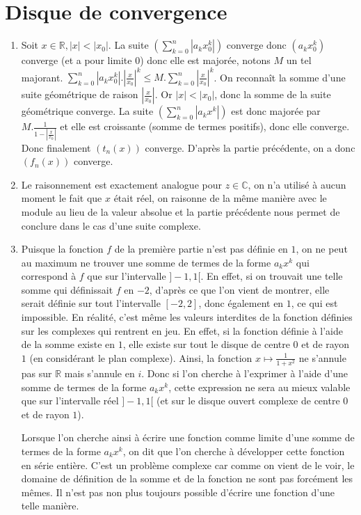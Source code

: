\documentclass[10pt,a4paper]{article}
\begin{document}
\section{Disque de convergence}
\begin{enumerate}
\item Soit $x\in\mathbb{R}, | x|<| x_0|$. La suite $(\sum\limits_{k=0}^n| a_kx_0^k|)$ converge donc $(a_kx_0^k)$ converge 
(et a pour limite $0$) donc elle est majorée, notons $M$ un tel majorant.
$\sum\limits_{k=0}^n| a_kx_0^k|.|\frac{x}{x_0}|^k\leqslant M.\sum\limits_{k=0}^n| \frac{x}{x_0}|^k$.
On reconnaît la somme d'une suite géométrique de raison $| \frac{x}{x_0}|$. Or $| x| < |x_0|$, donc la somme de la suite géométrique converge.
La suite $(\sum\limits_{k=0}^n| a_kx^k|)$ est donc majorée par $M.\frac{1}{1-|\frac{x}{x_0}|}$ et elle est croissante (somme de termes positifs), donc elle 
converge. Donc finalement $(t_n(x))$ converge. D'après la partie précédente, on a donc $(f_n(x))$ converge.
\item Le raisonnement est exactement analogue pour $z \in \mathbb{C}$, on n'a utilisé à aucun moment le fait que $x$ était réel, on raisonne de la même 
manière avec le module au lieu de la valeur absolue et la partie précédente nous permet de conclure dans le cas d'une suite complexe.
\item Puisque la fonction $f$ de la première partie n'est pas définie en $1$, on ne peut au maximum ne trouver une somme de termes de la forme $a_kx^k$
qui correspond à $f$ que sur 
l'intervalle $]-1,1[$. En effet, si on trouvait une telle somme qui définissait $f$ en $-2$, d'après ce que l'on vient de montrer, elle serait définie sur
tout l'intervalle $[-2,2]$, donc également en $1$, ce qui est impossible. En réalité, c'est même les valeurs interdites de la fonction définies sur les 
complexes qui rentrent en jeu. En effet, si la fonction définie à l'aide de la somme existe en $1$, elle existe sur tout le disque de centre $0$ et de rayon 
$1$ (en considérant le plan complexe). Ainsi, la fonction $x \mapsto \frac{1}{1+x^2}$ ne s'annule pas sur $\mathbb{R}$ mais s'annule en $i$. Donc si l'on 
cherche à l'exprimer à l'aide d'une somme de termes de la forme $a_kx^k$, cette expression ne sera au mieux valable que sur l'intervalle réel $]-1,1[$ (et 
sur le disque ouvert complexe de centre $0$ et de rayon $1$).

Lorsque l'on cherche ainsi à écrire une fonction comme limite d'une somme de termes de la forme $a_kx^k$, on dit que l'on cherche à développer cette fonction
en série entière. C'est un problème complexe car comme on vient de le voir, le domaine de définition de la somme et de la fonction ne sont pas forcément
les mêmes. Il n'est pas non plus toujours possible d'écrire une fonction d'une telle manière.
\end{enumerate}
\end{document}

